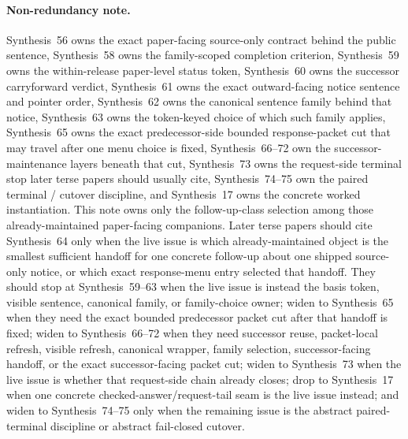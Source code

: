 \documentclass[11pt]{article}
\begin{document}
\paragraph{Non-redundancy note.}
Synthesis~56 owns the exact paper-facing source-only contract behind the public sentence, Synthesis~58 owns the family-scoped completion criterion, Synthesis~59 owns the within-release paper-level status token, Synthesis~60 owns the successor carryforward verdict, Synthesis~61 owns the exact outward-facing notice sentence and pointer order, Synthesis~62 owns the canonical sentence family behind that notice, Synthesis~63 owns the token-keyed choice of which such family applies, Synthesis~65 owns the exact predecessor-side bounded response-packet cut that may travel after one menu choice is fixed, Synthesis~66--72 own the successor-maintenance layers beneath that cut, Synthesis~73 owns the request-side terminal stop later terse papers should usually cite, Synthesis~74--75 own the paired terminal / cutover discipline, and Synthesis~17 owns the concrete worked instantiation.\cite{series:publicrequestcontracts,series:requestfulfillmentcertificates,series:publicrequeststatusenvelopes,series:publicrequestcarryforward,series:publicrequestnotices,series:publicrequestnoticenormalforms,series:publicrequestnoticeselections,series:publicrequestresponsepackets,series:publicrequestresponsepacketcaryforward,series:publicrequestresponsepacketdeltaledgers,series:publicrequestresponsepacketrefreshnotices,series:publicrequestresponsepacketrefreshnoticenormalforms,series:publicrequestresponsepacketrefreshnoticeselections,series:publicrequestresponsepacketrefreshresponsemenus,series:publicrequestresponsepacketrefreshresponsepackets,series:publicrequestresponsepacketrefreshresponsepacketclosureverdicts,series:pairedterminalcitationdiscipline,series:pairedterminalcutoverrules,series:workedexample}
This note owns only the follow-up-class selection among those already-maintained paper-facing companions. Later terse papers should cite Synthesis~64 only when the live issue is which already-maintained object is the smallest sufficient handoff for one concrete follow-up about one shipped source-only notice, or which exact response-menu entry selected that handoff. They should stop at Synthesis~59--63 when the live issue is instead the basis token, visible sentence, canonical family, or family-choice owner; widen to Synthesis~65 when they need the exact bounded predecessor packet cut after that handoff is fixed; widen to Synthesis~66--72 when they need successor reuse, packet-local refresh, visible refresh, canonical wrapper, family selection, successor-facing handoff, or the exact successor-facing packet cut; widen to Synthesis~73 when the live issue is whether that request-side chain already closes; drop to Synthesis~17 when one concrete checked-answer/request-tail seam is the live issue instead; and widen to Synthesis~74--75 only when the remaining issue is the abstract paired-terminal discipline or abstract fail-closed cutover.
\end{document}
